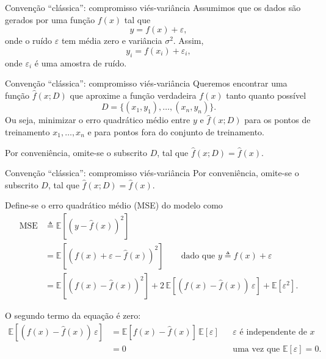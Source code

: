\documentclass{beamer}
\begin{document}
\begin{frame}{Convenção ``clássica'': compromisso viés-variância}
Assumimos que os dados são gerados por uma função $f(x)$ tal que
\[
y = f(x) + \varepsilon,
\]
onde o ruído $\varepsilon$ tem média zero e variância $\sigma^{2}$.
Assim,
\[
y_{i} = f(x_{i}) + \varepsilon_{i},
\]
onde $\varepsilon_{i}$ é uma amostra de ruído.
\end{frame}
\begin{frame}{Convenção ``clássica'': compromisso viés-variância}
Queremos encontrar uma função $\hat{f}(x; D)$ que aproxime a função verdadeira $f(x)$ tanto quanto possível
\[
D = \{(x_{1}, y_{1}), \dots, (x_{n}, y_{n})\}.
\]
Ou seja, minimizar o erro quadrático médio entre $y$ e $\hat{f}(x; D)$ para os pontos de treinamento $x_{1}, \dots, x_{n}$ e para pontos fora do conjunto de treinamento.

Por conveniência, omite-se o subscrito $D$, tal que $\hat{f}(x; D) = \hat{f}(x)$.

\end{frame}


\begin{frame}{Convenção ``clássica'': compromisso viés-variância}
Por conveniência, omite-se o subscrito $D$, tal que $\hat{f}(x; D) = \hat{f}(x)$.

Define-se o erro quadrático médio (MSE) do modelo como
\begin{align*}
\mathrm{MSE} 
&\triangleq \mathbb{E}\!\left[(y - \hat{f}(x))^{2}\right] \\
&= \mathbb{E}\!\left[(f(x) + \varepsilon - \hat{f}(x))^{2}\right] 
\qquad \text{dado que } y \triangleq f(x) + \varepsilon \\
&= \mathbb{E}\!\left[(f(x) - \hat{f}(x))^{2}\right]
   + 2\,\mathbb{E}\!\left[(f(x) - \hat{f}(x))\,\varepsilon\right]
   + \mathbb{E}\!\left[\varepsilon^{2}\right].
\end{align*}

O segundo termo da equação é zero:
\begin{align*}
\mathbb{E}\!\left[(f(x) - \hat{f}(x))\,\varepsilon\right]
&= \mathbb{E}\!\left[f(x) - \hat{f}(x)\right] \,
   \mathbb{E}\!\left[\varepsilon\right]
   && \text{$\varepsilon$ é independente de $x$} \\
&= 0
   && \text{uma vez que } \mathbb{E}\!\left[\varepsilon\right] = 0.
\end{align*}
\end{frame}
\end{document}
